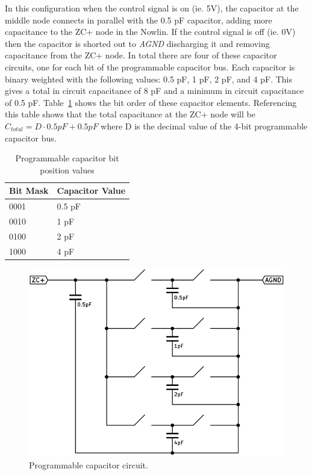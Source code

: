 \documentclass[12pt,oneside,final]{siuethesis}
\theoremstyle{definition}
\begin{document}
\par In this configuration when the control signal is on (ie. 5V), the capacitor at the middle node connects in parallel with the 0.5 pF capacitor, adding more capacitance to the ZC+ node in the Nowlin. If the control signal is off (ie. 0V) then the capacitor is shorted out to \emph{AGND} discharging it and removing capacitance from the ZC+ node. In total there are four of these capacitor circuits, one for each bit of the programmable capacitor bus. Each capacitor is binary weighted with the following values: 0.5 pF, 1 pF, 2 pF, and 4 pF. This gives a total in circuit capacitance of 8 pF and a minimum in circuit capacitance of 0.5 pF. Table~\ref{tab:pcap} shows the bit order of these capacitor elements. Referencing this table shows that the total capacitance at the ZC+ node will be $C_{total} = D \cdot 0.5pF + 0.5pF$ where D is the decimal value of the 4-bit programmable capacitor bus.
\begin{table}[ht]
\centering
	\begin{tabular}{|l|p{4cm}|}
		\hline
		Bit Mask & Capacitor Value\\\hline
		0001 & 0.5 pF\\\hline
		0010 & 1 pF\\\hline
		0100 & 2 pF\\\hline
		1000 & 4 pF\\\hline
	\end{tabular}
    \caption{Programmable capacitor bit position values}
 	\label{tab:pcap}
\end{table}
\begin{figure}[ht]
\centering
\includegraphics[scale=.6,keepaspectratio=true]{images/pcap_circuit.png} 
\caption{Programmable capacitor circuit.}
\label{fig:pcap}
\end{figure}
\end{document}
